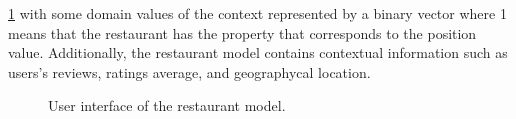 \ref{fig:restaurantmodel} with some domain values of the context
represented by a binary vector where 1 means that the restaurant has
the property that corresponds to the position value. Additionally, the
restaurant model contains contextual information such as users's reviews, ratings average, and geographycal location.\\  
\begin{figure}
\captionsetup{justification=centering,margin=2cm}
\centering
\setlength\fboxsep{0pt}
\setlength\fboxrule{0.7pt}
\caption{User interface of the restaurant model.}
\label{fig:restaurantmodel}       
\end{figure}
